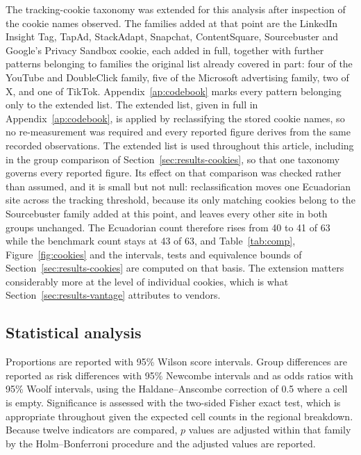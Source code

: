 \documentclass[pdflatex,sn-basic,Numbered,iicol]{sn-jnl}
\theoremstyle{thmstyleone}
\theoremstyle{thmstyletwo}
\theoremstyle{thmstylethree}
\begin{document}
The tracking-cookie taxonomy was extended for this analysis after inspection of the cookie names observed. The families added at that point are the LinkedIn Insight Tag, TapAd, StackAdapt, Snapchat, ContentSquare, Sourcebuster and Google's Privacy Sandbox cookie, each added in full, together with further patterns belonging to families the original list already covered in part: four of the YouTube and DoubleClick family, five of the Microsoft advertising family, two of X, and one of TikTok. Appendix~\ref{ap:codebook} marks every pattern belonging only to the extended list. The extended list, given in full in Appendix~\ref{ap:codebook}, is applied by reclassifying the stored cookie names, so no re-measurement was required and every reported figure derives from the same recorded observations. The extended list is used throughout this article, including in the group comparison of Section~\ref{sec:results-cookies}, so that one taxonomy governs every reported figure. Its effect on that comparison was checked rather than assumed, and it is small but not null: reclassification moves one Ecuadorian site across the tracking threshold, because its only matching cookies belong to the Sourcebuster family added at this point, and leaves every other site in both groups unchanged. The Ecuadorian count therefore rises from 40 to 41 of 63 while the benchmark count stays at 43 of 63, and Table~\ref{tab:comp}, Figure~\ref{fig:cookies} and the intervals, tests and equivalence bounds of Section~\ref{sec:results-cookies} are computed on that basis. The extension matters considerably more at the level of individual cookies, which is what Section~\ref{sec:results-vantage} attributes to vendors.

\subsection{Statistical analysis}\label{sec:methods-stats}

Proportions are reported with 95\% Wilson score intervals. Group differences are reported as risk differences with 95\% Newcombe intervals and as odds ratios with 95\% Woolf intervals, using the Haldane--Anscombe correction of 0.5 where a cell is empty. Significance is assessed with the two-sided Fisher exact test, which is appropriate throughout given the expected cell counts in the regional breakdown. Because twelve indicators are compared, $p$ values are adjusted within that family by the Holm--Bonferroni procedure and the adjusted values are reported.
\end{document}
